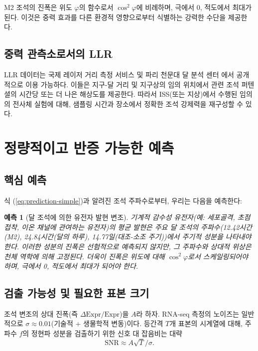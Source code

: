 \documentclass[12pt,a4paper]{article}
\newtheorem{prediction}[theorem]{예측}
\theoremstyle{remark}
\begin{document}
	M2 조석의 진폭은 위도 \(\varphi\)의 함수로서 \(\cos^2\varphi\)에 비례하며, 극에서 0, 적도에서 최대가 된다. 이것은 중력 효과를 다른 환경적 영향으로부터 식별하는 강력한 수단을 제공한다.
	
	\subsection{중력 관측소로서의 LLR}
	
	LLR 데이터는 국제 레이저 거리 측정 서비스 \cite{ILRS} 및 파리 천문대 달 분석 센터 \cite{LLR-POLAC}에서 공개적으로 이용 가능하다. 이들은 지구-달 거리 및 지구상의 임의 위치에서 관련 조석 퍼텐셜의 시간당 또는 더 나은 해상도를 제공한다. 따라서 ISS(또는 지상)에서 수행된 임의의 전사체 실험에 대해, 샘플링 시간과 장소에서 정확한 조석 강제력을 재구성할 수 있다.
	
	\section{정량적이고 반증 가능한 예측}
	\label{sec:prediction}
	
	\subsection{핵심 예측}
	
	식 (\ref{eq:prediction-simple})과 알려진 조석 주파수로부터, 우리는 다음을 예측한다:
	
	\begin{prediction}[달 조석에 의한 유전자 발현 변조]
		기계적 감수성 유전자(예: 세포골격, 초점 접착, 이온 채널에 관여하는 유전자)의 평균 발현은 주요 달 조석의 주파수(12.42시간(M2), 24.84시간(달의 하루), 14.77일(대조-소조 주기))에서 주기적 성분을 나타내야 한다. 이러한 성분의 진폭은 선험적으로 예측되지 않지만, 그 주파수와 상대적 위상은 천체 역학에 의해 고정된다. 더욱이 진폭은 위도에 대해 \(\cos^2\varphi\)로서 스케일링되어야 하며, 극에서 0, 적도에서 최대가 되어야 한다.
	\end{prediction}
	
	\subsection{검출 가능성 및 필요한 표본 크기}
	
	조석 변조의 상대 진폭(즉 \(\Delta\text{Expr}/\text{Expr}\))을 \(A\)라 하자. RNA-seq 측정의 노이즈는 일반적으로 \(\sigma \approx 0.01\)(기술적 + 생물학적 변동)이다. 등간격 \(T\)개 표본의 시계열에 대해, 주파수 \(f\)의 정현파 성분을 검출하기 위한 신호 대 잡음비는 대략
	\[
	\mathrm{SNR} \approx A \sqrt{T} / \sigma .
	\]
	
\end{document}
